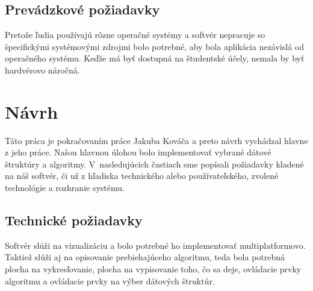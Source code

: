 \subsection{Prevádzkové požiadavky}

Pretože ľudia používajú rôzne operačné systémy a softvér nepracuje so 
špecifickými systémovými zdrojmi bolo potrebné, aby bola aplikácia nezávislá 
od operačného systému. Keďže má byť dostupná na študentské účely, nemala by 
byť hardvérovo náročná.

\section{Návrh}

Táto práca je pokračovaním práce Jakuba Kováča a preto návrh vychádzal hlavne z 
jeho práce. Našou hlavnou úlohou bolo implementovať vybrané dátové štruktúry a 
algoritmy. V~nasledujúcich častiach sme popísali požiadavky kladené na náš 
softvér, či už z hľadiska technického alebo používateľského, zvolené 
technológie a rozhranie systému.

\subsection{Technické požiadavky}

Softvér slúži na vizualizáciu a bolo potrebné ho implementovať multiplatformovo.
Taktiež slúži aj na opisovanie prebiehajúceho algoritmu, teda 
bola potrebná plocha na vykresľovanie, plocha na vypisovanie toho, čo sa deje, 
ovládacie prvky algoritmu a ovládacie prvky na výber dátových štruktúr.

